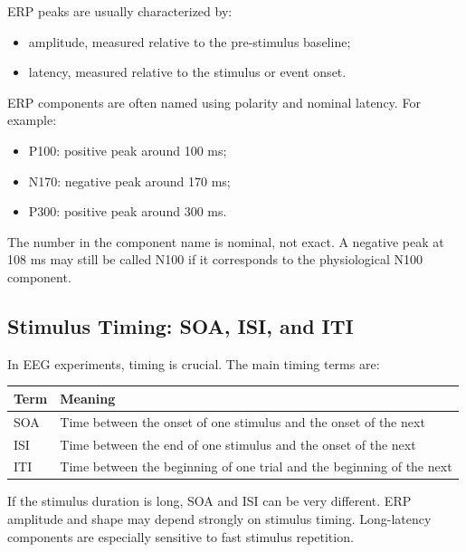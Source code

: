 ERP peaks are usually characterized by:

\begin{itemize}[noitemsep]
    \item amplitude, measured relative to the pre-stimulus baseline;
    \item latency, measured relative to the stimulus or event onset.
\end{itemize}

ERP components are often named using polarity and nominal latency. For example:

\begin{itemize}[noitemsep]
    \item P100: positive peak around 100 ms;
    \item N170: negative peak around 170 ms;
    \item P300: positive peak around 300 ms.
\end{itemize}

\begin{authornote}
The number in the component name is nominal, not exact. A negative peak at 108 ms may still be called N100 if it corresponds to the physiological N100 component.
\end{authornote}

\subsection{Stimulus Timing: SOA, ISI, and ITI}

In EEG experiments, timing is crucial. The main timing terms are:

\begin{center}
\begin{tabular}{ll}
\toprule
\textbf{Term} & \textbf{Meaning} \\
\midrule
SOA & Time between the onset of one stimulus and the onset of the next \\
ISI & Time between the end of one stimulus and the onset of the next \\
ITI & Time between the beginning of one trial and the beginning of the next \\
\bottomrule
\end{tabular}
\end{center}

If the stimulus duration is long, SOA and ISI can be very different. ERP amplitude and shape may depend strongly on stimulus timing. Long-latency components are especially sensitive to fast stimulus repetition.

